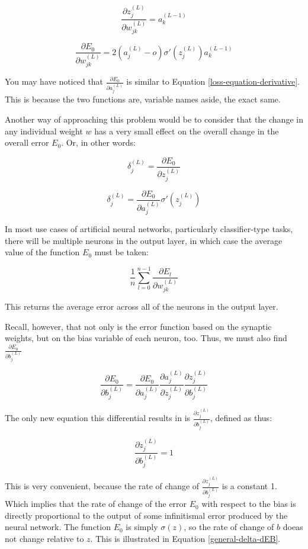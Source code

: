 \documentclass[12pt]{article}
\begin{document}
\[ \frac{\partial z_j^{(L)}}{\partial w_{jk}^{(L)}} = a_k^{(L-1)}\]

\begin{equation} \label{chain-rule-applied}
    \frac{\partial E_0}{\partial w_{jk}^{(L)}} = 2 (a_j^{(L)} - o) \sigma '(z_j^{(L)}) a_k^{(L-1)}
\end{equation}

You may have noticed that $\frac{\partial E_0}{\partial a_j^{(L)}}$ is similar to Equation \ref{loss-equation-derivative}. This is because the two functions are, variable names aside, the exact same.

Another way of approaching this problem would be to consider that the change in any individual weight $w$ has a very small effect on the overall change in the overall error $E_0$. Or, in other words:

\[ \delta_{j}^{(L)} = \frac{\partial E_0}{\partial z_j^{(L)}} \]

\[ \delta_j^{(L)} = \frac{\partial E_0}{\partial a_j^{(L)}} \sigma '(z_j^{(L)})\]

In most use cases of artificial neural networks, particularly classifier-type tasks, there will be multiple neurons in the output layer, in which case the average value of the function $E_0$ must be taken:

\[ \frac{1}{n}\sum_{l=0}^{n-1} \frac{\partial E_l}{\partial w_{jk}^{(L)}}\]

This returns the average error across all of the neurons in the output layer.

Recall, however, that not only is the error function based on the synaptic weights, but on the bias variable of each neuron, too. Thus, we must also find $\frac{\partial E_0}{\partial b_j^{(L)}}$

\[ \frac{\partial E_0}{\partial b_j^{(L)}} = \frac{\partial E_0}{\partial a_j^{(L)}}  \frac{\partial a_j^{(L)}}{\partial z_j^{(L)}} \frac{\partial z_j^{(L)}}{\partial b_j^{(L)}}\]

The only new equation this differential results in is $\frac{\partial z_j^{(L)}}{\partial b_j^{(L)}}$, defined as thus:

\[\frac{\partial z_j^{(L)}}{\partial b_j^{(L)}} = 1 \]

This is very convenient, because the rate of change of $\frac{\partial z_j^{(L)}}{\partial b_j^{(L)}}$ is a constant 1. Which implies that the rate of change of the error $E_0$ with respect to the bias is directly proportional to the output of some infinitismal error produced by the neural network. The function $E_0$ is simply $\sigma(z)$, so the rate of change of $b$ doeas not change relative to $z$. This is illustrated in Equation \ref{general-delta-dEB}.
\end{document}
